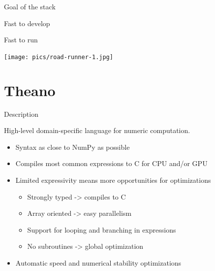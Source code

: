 \documentclass[utf8x,xcolor=pdftex,dvipsnames,table]{beamer}
\begin{document}
\begin{frame}{Goal of the stack}
\begin{center}
\begin{bf}Fast to develop\end{bf}\newline \bigskip
\begin{bf}Fast to run\end{bf}\newline \bigskip
\hspace{-2.5cm}
\texttt{[image: pics/road-runner-1.jpg]}
\end{center}
\end{frame}


\section{Theano}
\begin{frame}
  \tableofcontents[currentsection]
\end{frame}

\begin{frame}{Description}

  High-level domain-specific language for numeric computation.

  \begin{itemize}
    \item Syntax as close to NumPy as possible
    \item Compiles most common expressions to C for CPU and/or GPU
    \item Limited expressivity means more opportunities for optimizations
    \begin{itemize}
      \item Strongly typed -> compiles to C
      \item Array oriented -> easy parallelism
      \item Support for looping and branching in expressions
      \item No subroutines -> global optimization
    \end{itemize}
    \item Automatic speed and numerical stability optimizations
  \end{itemize}
\end{frame}
\end{document}

